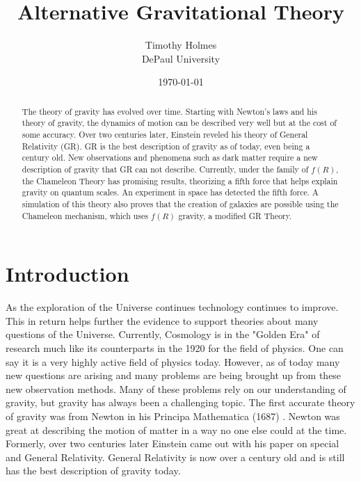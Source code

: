 \documentclass[a4paper]{article}
\title{Alternative Gravitational Theory}
\author{Timothy Holmes \\ 
        DePaul University}
\date{\today}
\begin{document}
\maketitle

\begin{abstract}
The theory of gravity has evolved over time. Starting with Newton's laws and his theory of gravity, the dynamics of motion can be described very well but at the cost of some accuracy. Over two centuries later, Einstein reveled his theory of General Relativity (GR). GR is the best description of gravity as of today, even being a century old. New observations and phenomena such as dark matter require a new description of gravity that GR can not describe. Currently, under the family of $f(R)$, the Chameleon Theory has promising results, theorizing a fifth force that helps explain gravity on quantum scales. An experiment in space has detected the fifth force. A simulation of this theory also proves that the creation of galaxies are possible using the Chameleon mechanism, which uses $f(R)$ gravity, a modified GR Theory.
\end{abstract}

\section{Introduction}

As the exploration of the Universe continues technology continues to improve. This in return helps further the evidence to support theories about many questions of the Universe. Currently, Cosmology is in the "Golden Era" of research much like its counterparts in the 1920 for the field of physics. One can say it is a very highly active field of physics today. However, as of today many new questions are arising and many problems are being brought up from these new observation methods. Many of these problems rely on our understanding of gravity, but gravity has always been a challenging topic. The first accurate theory of gravity was from Newton in his Principa Mathematica (1687) \cite{J__2011}. Newton was great at describing the motion of matter in a way no one else could at the time. Formerly, over two centuries later Einstein came out with his paper on special and General Relativity. General Relativity is now over a century old and is still has the best description of gravity today. 
\end{document}
